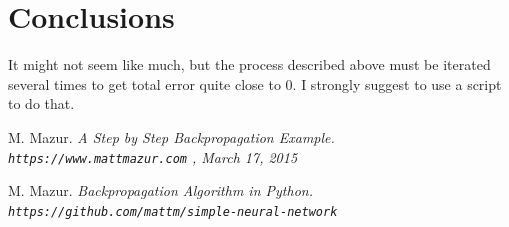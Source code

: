\documentclass[12pt]{article}
\begin{document}
\section{Conclusions}
It might not seem like much, but the process described above must be iterated several times to get total error quite close to 0. I strongly suggest to use a script \cite{repo-git} to do that.
\begin{thebibliography}{2}
M. Mazur.
\textit{A Step by Step Backpropagation Example. \\\texttt{https://www.mattmazur.com} , March 17, 2015}

M. Mazur.
\textit{Backpropagation Algorithm in Python. \\\texttt{https://github.com/mattm/simple-neural-network}}
\end{thebibliography}
\end{document}
